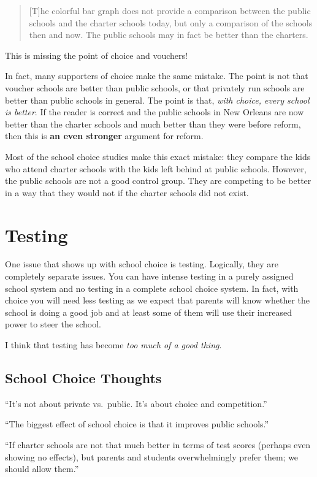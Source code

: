 \begin{quote}
    [T]he colorful bar graph does not provide a comparison between the public
    schools and the charter schools today, but only a comparison of the schools
    then and now. The public schools may in fact be better than the charters.
\end{quote}

This is missing the point of choice and vouchers!

In fact, many supporters of choice make the same mistake. The point is not that
voucher schools are better than public schools, or that privately run schools
are better than public schools in general. The point is that, \emph{with
choice, every school is better}. If the reader is correct and the public
schools in New Orleans are now better than the charter schools and much better
than they were before reform, then this is \textbf{an even stronger} argument
for reform.

Most of the school choice studies make this exact mistake: they compare the
kids who attend charter schools with the kids left behind at public schools.
However, the public schools are not a good control group. They are competing to
be better in a way that they would not if the charter schools did not exist.

\section{Testing}

One issue that shows up with school choice is testing. Logically, they are
completely separate issues. You can have intense testing in a purely assigned
school system and no testing in a complete school choice system. In fact, with
choice you will need less testing as we expect that parents will know whether
the school is doing a good job and at least some of them will use their
increased power to steer the school.

I think that testing has become \emph{too much of a good thing}.

\subsection{School Choice Thoughts}

``It's not about private vs.\ public. It's about choice and competition.''

``The biggest effect of school choice is that it improves public schools.''

``If charter schools are not that much better in terms of test scores (perhaps
even showing no effects), but parents and students overwhelmingly prefer them;
we should allow them.''

